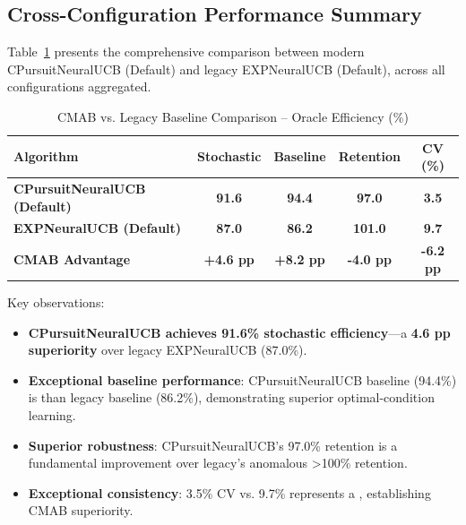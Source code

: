 \documentclass[12pt,a4paper]{article}
\newcommand{\success}[1]{\textcolor{accentgreen}{\textbf{#1}}}
\newcommand{\legacy}[1]{\textcolor{legacycolor}{\textbf{#1}}}
\begin{document}
\begin{tcolorbox}[colback=tableheader,colframe=primaryblue,title=\textbf{Primary Performance Results: CPursuitNeuralUCB vs. Legacy EXPNeuralUCB}]

\subsection{Cross-Configuration Performance Summary}

Table~\ref{tab:cmab_vs_legacy} presents the comprehensive comparison between modern CPursuitNeuralUCB (Default) and legacy EXPNeuralUCB (Default), across all configurations aggregated.

\begin{table}[H]
\centering
\caption{CMAB vs. Legacy Baseline Comparison -- Oracle Efficiency (\%)}
\label{tab:cmab_vs_legacy}
\begin{tabular}{@{}lcccc@{}}
\toprule
\textbf{Algorithm} & \textbf{Stochastic} & \textbf{Baseline} & \textbf{Retention} & \textbf{CV (\%)} \\
\midrule
\success{CPursuitNeuralUCB (Default)} & \success{91.6} & \success{94.4} & \success{97.0} & \success{3.5} \\
\legacy{EXPNeuralUCB (Default)} & \legacy{87.0} & \legacy{86.2} & \legacy{101.0} & \legacy{9.7} \\
\midrule
\textbf{CMAB Advantage} & \textbf{+4.6 pp} & \textbf{+8.2 pp} & \textbf{-4.0 pp} & \textbf{-6.2 pp} \\
\bottomrule
\end{tabular}
\end{table}

Key observations:

\begin{itemize}
    \item \success{CPursuitNeuralUCB achieves 91.6\% stochastic efficiency}—a \success{4.6 pp superiority} over legacy EXPNeuralUCB (87.0\%).
    
    \item \success{Exceptional baseline performance}: CPursuitNeuralUCB baseline (94.4\%) is  than legacy baseline (86.2\%), demonstrating superior optimal-condition learning.
    
    \item \success{Superior robustness}: CPursuitNeuralUCB's 97.0\% retention is a fundamental improvement over legacy's anomalous >100\% retention.
    
    \item \success{Exceptional consistency}: 3.5\% CV vs. 9.7\% represents a , establishing CMAB superiority.
\end{itemize}

\end{tcolorbox}
\end{document}
